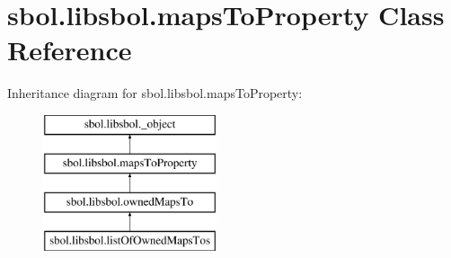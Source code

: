 \hypertarget{classsbol_1_1libsbol_1_1maps_to_property}{}\section{sbol.\+libsbol.\+maps\+To\+Property Class Reference}
\label{classsbol_1_1libsbol_1_1maps_to_property}
Inheritance diagram for sbol.\+libsbol.\+maps\+To\+Property\+:\begin{figure}[H]
\begin{center}
\leavevmode
\includegraphics[height=4.000000cm]{classsbol_1_1libsbol_1_1maps_to_property}
\end{center}
\end{figure}
